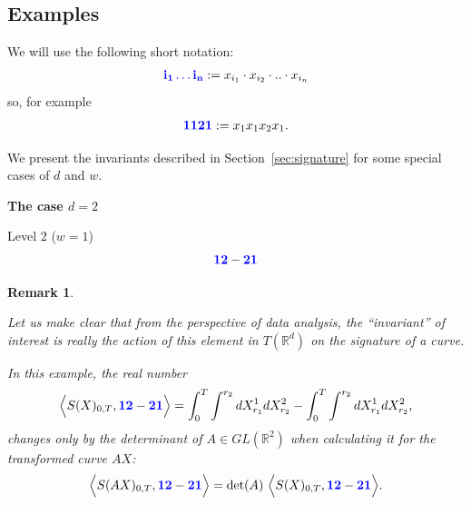 \documentclass{scrartcl}
\theoremstyle{plain}
\newtheorem{remark}[theorem]{Remark}
\theoremstyle{definition}
\newcommand{\R}{\mathbb{R}}
\newcommand{\1}[1]{1_{\{#1\}}}
\newcommand{\ds}{d} %
\newcommand{\TS}{T(\R^\ds)} %
\def\word#1{{\color{blue}\mathbf{#1}}}
\begin{document}
\subsection{Examples}
\label{sec:explicit}

We will use the following short notation: 
\begin{align*}
  \word{i_1 \dots i_n} := x_{i_1} \cdot x_{i_2} \cdot .. \cdot x_{i_n}
\end{align*}
so, for example
\begin{align*}
  \word{1121} := x_1 x_1 x_2 x_1.
\end{align*}

We present the invariants described in Section~\ref{sec:signature}
for some special cases of $\ds$ and $w$.


\textbf{The case $\ds=2$}

Level $2$ ($w=1$)
\begin{align*}
  \word{12} - \word{21} 
\end{align*}

\begin{remark}
  \label{rem:interpretation}

  Let us make clear that from the perspective of data analysis,
  the ``invariant'' of interest is really the action of this element in $\TS$
  on the signature of a curve.

  In this example, the real number
  \begin{align*}
    \Big\langle S(X)_{0,T}, \word{12} - \word{21} \Big\rangle
    =  
    \int_0^T \int^{r_2} dX^1_{r_1} dX^2_{r_2}
    -
    \int_0^T \int^{r_2} dX^1_{r_1} dX^2_{r_2},
  \end{align*}
  changes only by the determinant of $A \in GL(\R^2)$ when
  calculating it for the transformed curve $A X$:
  \begin{align*}
    \Big\langle S(A X)_{0,T}, \word{12} - \word{21} \Big\rangle = \det(A)\ \Big\langle S(X)_{0,T}, \word{12} - \word{21} \Big\rangle.
  \end{align*}
\end{remark}
\end{document}
